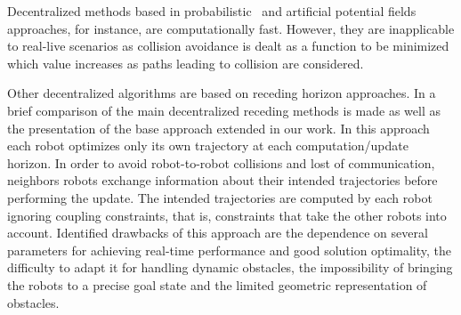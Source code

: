 \documentclass[eprint]{actapoly}
\begin{document}
Decentralized methods based in probabilistic~\cite{Sanchez2002} and artificial 
potential fields~\cite{Khatib1986} approaches, for instance, are computationally fast.
However, they are inapplicable to real-live scenarios as collision avoidance
is dealt as a function to be minimized which value increases as paths leading
to collision are considered.

Other decentralized algorithms are based on receding horizon approaches.
In \cite{Defoort2009} a brief comparison of the main decentralized receding 
methods is made as well as the presentation of the base approach extended in
our work.
In this approach each robot optimizes only its own 
trajectory at each computation/update horizon. In order to
avoid robot-to-robot collisions and lost of communication, neighbors robots 
exchange information about their intended trajectories before 
performing the update. The intended trajectories are computed by each robot
ignoring coupling constraints, that is, constraints that take the other robots 
into account.
Identified drawbacks of this approach are the dependence on 
several parameters for achieving real-time performance and good solution 
optimality, the difficulty to adapt it for handling dynamic obstacles, the 
impossibility of bringing the robots to a precise goal state and the limited
geometric representation of obstacles.

%
%
%
% 
%
%
% 
%
%
% 
%
\end{document}
